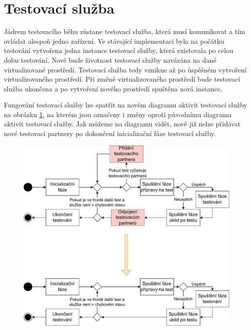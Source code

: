 \section{Testovací služba}

Jádrem testovacího běhu zůstane testovací služba, která musí komunikovat a tím ovládat alespoň jedno zařízení. Ve stávající implementaci byla na počátku testování vytvořena jedna instance testovací služby, která existovala po celou dobu testování. Nově bude životnost testovací služby navázána na dané virtualizované prostředí. Testovací služba tedy vznikne až po úspěšném vytvoření virtualizovaného prostředí. Při změně virtualizovaného prostředí bude testovací služba ukončena a po vytvoření nového prostředí spuštěna nová instance.

Fungování testovací služby lze spatřit na novém diagramu aktivit testovací služby na obrázku \ref{fig:activitydiagramservice}, na kterém jsou označeny i změny oproti původnímu diagramu aktivit testovací služby. Jak můžeme na diagramu vidět, nově již nelze přidávat nové testovací partnery po dokončení inicializační fáze testovací služby.

\begin{figure}[htbp]
    \centering 
    \includegraphics[width=\textwidth]{assets/img/activitydiagramservicechange.pdf}
    \label{fig:activitydiagramservice}
\end{figure}

